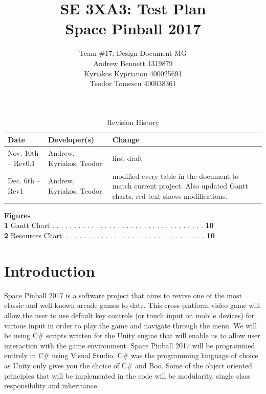 \documentclass[12pt, titlepage]{article}
\title{SE 3XA3: Test Plan\\Space Pinball 2017}
\author{Team \#17, Design Document MG
		\\ Andrew Bennett 1319879
		\\ Kyriakos Kyprianou  400025691 
		\\ Teodor Tomescu 400038361
}
\date{}
\begin{document}
\begin{table}[hp]
\caption{Revision History} \label{TblRevisionHistory}
\begin{tabularx}{\textwidth}{llX}
\toprule
\textbf{Date} & \textbf{Developer(s)} & \textbf{Change}\\
\midrule
Nov. 10th -- Rev0.1 	& Andrew, Kyriakos, Teodor & first draft \\
Dec. 6th  -- Rev1		& Andrew, Kyriakos, Teodor & modified every table in the document to match current project. Also updated Gantt charts. red text shows modifications.\\

\bottomrule
\end{tabularx}
\end{table}

\newpage


\maketitle

\clearpage

\tableofcontents

\vspace{5mm}
\textbf{{\Large Figures}}\\

\textbf{1} Gantt Chart . . . . . . . . . . . . . . . . . . . . . . . . . . . . . . . . . . . \textbf{10}\\
\textbf{2} Resources Chart. . . . . . . . . . . . . . . . . . . . . . . . . . . . . . . . . \textbf{10}

\clearpage

\newpage

\clearpage

\newpage


\section{Introduction}

Space Pinball 2017 is a software project that aims to revive one of the most classic and well-known arcade games to date. This cross-platform video game will allow the user to use default key controls (or touch input on mobile devices) for various input in order to play the game and navigate through the menu. We will be using C\# scripts written for the Unity engine that will enable us to allow user interaction with the game environment. Space Pinball 2017 will be programmed entirely in C\# using Visual Studio. C\# was the programming language of choice as Unity only gives you the choice of C\# and Boo. Some of the object oriented principles that will be implemented in the code will be modularity, single class responsibility and inheritance. \\
\end{document}
